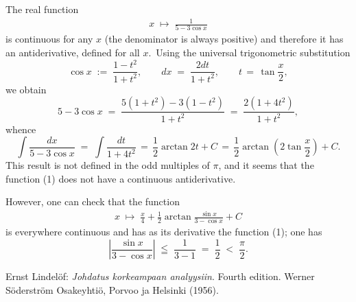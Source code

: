 \documentclass[12pt]{article}
\theoremstyle{definition}
\begin{document}
The real function
\begin{align}
x \;\mapsto\; \frac{1}{5-3\cos{x}}
\end{align}
is continuous for any $x$ (the denominator is always positive) and therefore it has an antiderivative, defined for all $x$.\, Using the universal trigonometric substitution
$$\cos{x} \;:=\; \frac{1\!-\!t^2}{1\!+\!t^2}, \qquad  dx \;=\; \frac{2dt}{1\!+\!t^2},
 \qquad t \,=\, \tan\frac{x}{2},$$
we obtain
$$5-3\cos{x} \;=\; \frac{5(1\!+\!t^2)-3(1\!-\!t^2)}{1\!+\!t^2} \;=\; \frac{2(1\!+\!4t^2)}{1\!+\!t^2},$$
whence
$$\int\!\frac{dx}{5-3\cos{x}} \;=\; \int\!\frac{dt}{1\!+\!4t^2} \,=\, \frac{1}{2}\arctan2t+C 
\,=\, \frac{1}{2}\arctan\!\left(2\tan\frac{x}{2}\right)+C.$$
This result is not defined in the odd multiples of $\pi$, and it seems that the function (1) does not have a continuous antiderivative.

However, one can check that the function
\begin{align}
x \;\mapsto\; \frac{x}{4}+\frac{1}{2}\arctan\frac{\sin{x}}{3-\cos{x}}+C
\end{align}
is everywhere continuous and has as its derivative the function (1); one has
$$\left|\frac{\sin{x}}{3-\cos{x}}\right| \;\leqq\; \frac{1}{3\!-\!1} \;=\; \frac{1}{2} \;<\; \frac{\pi}{2}.$$

\begin{thebibliography}{9}
 {\sc Ernst Lindel\"of}: {\em Johdatus korkeampaan analyysiin}. Fourth edition. Werner S\"oderstr\"om Osakeyhti\"o, Porvoo ja Helsinki (1956).
\end{thebibliography}

\end{document}
